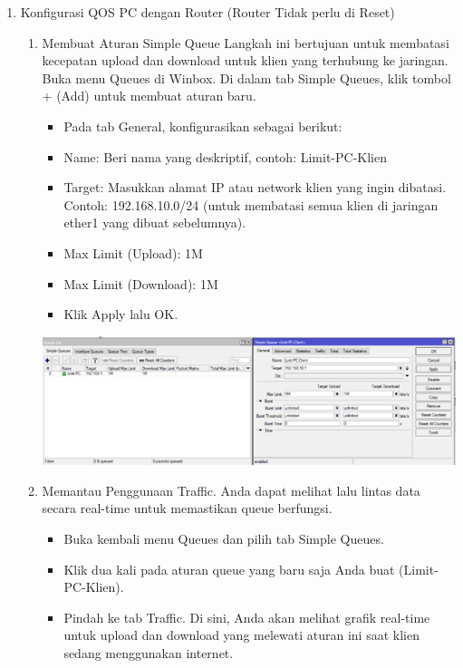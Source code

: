 \begin{enumerate}
\begin{enumerate}
    \end{enumerate}
    \item Konfigurasi QOS PC dengan Router (Router Tidak perlu di Reset)
    \begin{enumerate}
        \item Membuat Aturan Simple Queue Langkah ini bertujuan untuk membatasi kecepatan upload dan download untuk klien yang terhubung ke jaringan. Buka menu Queues di Winbox. Di dalam tab Simple Queues, klik tombol + (Add) untuk membuat aturan baru.
        \begin{itemize}
            \item Pada tab General, konfigurasikan sebagai berikut:
            \item Name: Beri nama yang deskriptif, contoh: Limit-PC-Klien
            \item Target: Masukkan alamat IP atau network klien yang ingin dibatasi. Contoh: 192.168.10.0/24 (untuk membatasi semua klien di jaringan ether1 yang dibuat sebelumnya).
            \item Max Limit (Upload): 1M
            \item Max Limit (Download): 1M
            \item Klik Apply lalu OK.
        \end{itemize}
        \begin{center}
            \includegraphics[scale=0.9]{P1/img/1 Membuat Aturan Simple Queue.png}        
        \end{center}
        \item Memantau Penggunaan Traffic. Anda dapat melihat lalu lintas data secara real-time untuk memastikan queue berfungsi.
        \begin{itemize}
            \item Buka kembali menu Queues dan pilih tab Simple Queues.
            \item Klik dua kali pada aturan queue yang baru saja Anda buat (Limit-PC-Klien).
            \item Pindah ke tab Traffic. Di sini, Anda akan melihat grafik real-time untuk upload dan download yang melewati aturan ini saat klien sedang menggunakan internet.

\end{itemize}
\end{enumerate}
\end{enumerate}
